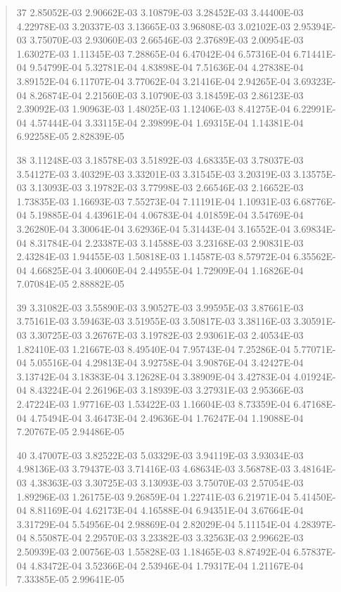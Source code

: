 \documentclass[letterpaper,10pt,english]{sphinxmanual}
\begin{document}
\begin{quote}
\begin{DUlineblock}{0em}
\item[] 37   2.85052E-03  2.90662E-03  3.10879E-03  3.28452E-03  3.44400E-03  4.22978E-03  3.20337E-03  3.13665E-03  3.96808E-03  3.02102E-03  2.95394E-03  3.75070E-03  2.93060E-03  2.66546E-03  2.37689E-03  2.00954E-03  1.63027E-03  1.11345E-03  7.28865E-04  6.47042E-04  6.57316E-04  6.71441E-04  9.54799E-04  5.32781E-04  4.83898E-04  7.51636E-04  4.27838E-04  3.89152E-04  6.11707E-04  3.77062E-04  3.21416E-04  2.94265E-04  3.69323E-04  8.26874E-04  2.21560E-03  3.10790E-03  3.18459E-03  2.86123E-03  2.39092E-03  1.90963E-03  1.48025E-03  1.12406E-03  8.41275E-04  6.22991E-04  4.57444E-04  3.33115E-04  2.39899E-04  1.69315E-04  1.14381E-04  6.92258E-05  2.82839E-05
\item[] 38   3.11248E-03  3.18578E-03  3.51892E-03  4.68335E-03  3.78037E-03  3.54127E-03  3.40329E-03  3.33201E-03  3.31545E-03  3.20319E-03  3.13575E-03  3.13093E-03  3.19782E-03  3.77998E-03  2.66546E-03  2.16652E-03  1.73835E-03  1.16693E-03  7.55273E-04  7.11191E-04  1.10931E-03  6.68776E-04  5.19885E-04  4.43961E-04  4.06783E-04  4.01859E-04  3.54769E-04  3.26280E-04  3.30064E-04  3.62936E-04  5.31443E-04  3.16552E-04  3.69834E-04  8.31784E-04  2.23387E-03  3.14588E-03  3.23168E-03  2.90831E-03  2.43284E-03  1.94455E-03  1.50818E-03  1.14587E-03  8.57972E-04  6.35562E-04  4.66825E-04  3.40060E-04  2.44955E-04  1.72909E-04  1.16826E-04  7.07084E-05  2.88882E-05
\item[] 39   3.31082E-03  3.55890E-03  3.90527E-03  3.99595E-03  3.87661E-03  3.75161E-03  3.59463E-03  3.51955E-03  3.50817E-03  3.38116E-03  3.30591E-03  3.30725E-03  3.26767E-03  3.19782E-03  2.93061E-03  2.40534E-03  1.82410E-03  1.21667E-03  8.49540E-04  7.95743E-04  7.25286E-04  5.77071E-04  5.05516E-04  4.29813E-04  3.92758E-04  3.90876E-04  3.42427E-04  3.13742E-04  3.18383E-04  3.12628E-04  3.38909E-04  3.42783E-04  4.01924E-04  8.43224E-04  2.26196E-03  3.18939E-03  3.27931E-03  2.95366E-03  2.47224E-03  1.97716E-03  1.53422E-03  1.16604E-03  8.73359E-04  6.47168E-04  4.75494E-04  3.46473E-04  2.49636E-04  1.76247E-04  1.19088E-04  7.20767E-05  2.94486E-05
\item[] 40   3.47007E-03  3.82522E-03  5.03329E-03  3.94119E-03  3.93034E-03  4.98136E-03  3.79437E-03  3.71416E-03  4.68634E-03  3.56878E-03  3.48164E-03  4.38363E-03  3.30725E-03  3.13093E-03  3.75070E-03  2.57054E-03  1.89296E-03  1.26175E-03  9.26859E-04  1.22741E-03  6.21971E-04  5.41450E-04  8.81169E-04  4.62173E-04  4.16588E-04  6.94351E-04  3.67664E-04  3.31729E-04  5.54956E-04  2.98869E-04  2.82029E-04  5.11154E-04  4.28397E-04  8.55087E-04  2.29570E-03  3.23382E-03  3.32563E-03  2.99662E-03  2.50939E-03  2.00756E-03  1.55828E-03  1.18465E-03  8.87492E-04  6.57837E-04  4.83472E-04  3.52366E-04  2.53946E-04  1.79317E-04  1.21167E-04  7.33385E-05  2.99641E-05

\end{DUlineblock}
\end{quote}
\end{document}
